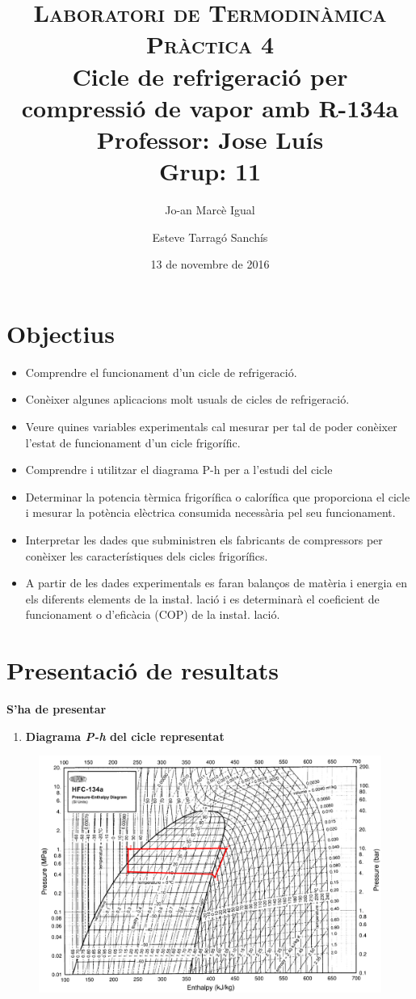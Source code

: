 \documentclass[a4paper]{article}
\title{
	\textsc{Laboratori de Termodinàmica} \\
	\textsc{Pràctica 4} \\
	Cicle de refrigeració per compressió de vapor amb R-134a \\
	\large
	Professor: Jose Luís \\ Grup: 11 }
\author{Jo-an Marcè Igual \and Esteve Tarragó Sanchís}
\date{13 de novembre de 2016}
\begin{document}
\maketitle

\section{Objectius}

\begin{itemize}
	\item Comprendre el funcionament d’un cicle de refrigeració.
	\item Conèixer algunes aplicacions molt usuals de cicles de refrigeració.
	\item Veure quines variables experimentals cal mesurar per tal de poder conèixer l’estat de funcionament d’un cicle frigorífic.
	\item Comprendre i utilitzar el diagrama P-h per a l’estudi del cicle
	\item Determinar la potencia tèrmica frigorífica o calorífica que proporciona el cicle i mesurar la potència elèctrica consumida necessària pel seu funcionament.
	\item Interpretar les dades que subministren els fabricants de compressors per conèixer les característiques dels cicles frigorífics.
	\item A partir de les dades experimentals es faran balanços de matèria i energia en els diferents elements de la insta\l. lació i es determinarà el coeficient de funcionament o d’eficàcia (COP) de la insta\l. lació.
\end{itemize}

\section{Presentació de resultats}

\textbf{S'ha de presentar}
\begin{enumerate}
	\item \textbf{Diagrama \emph{P-h} del cicle representat}
\end{enumerate}

\begin{figure}[H]
	\centering
	\includegraphics[width=\textwidth]{imatges/grafic-p-h.png}
\end{figure}
\end{document}

